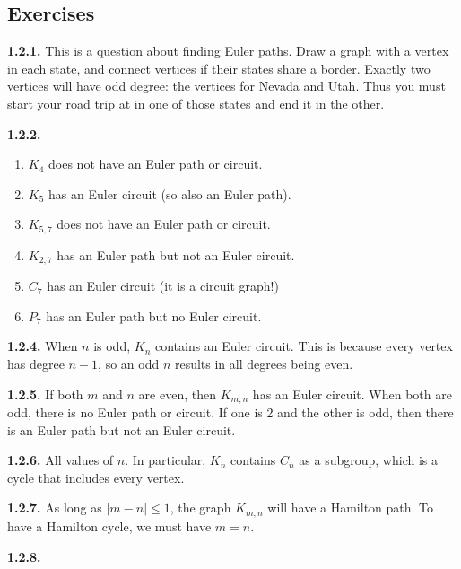 \documentclass[10pt,]{book}
\theoremstyle{plain}
\theoremstyle{definition}
\theoremstyle{definition}
\theoremstyle{definition}
\theoremstyle{definition}
\numberwithin{equation}{chapter}
\begin{document}
\subsection*{ Exercises}
\noindent\textbf{1.2.1.} \hypertarget{p-161}{}%
This is a question about finding Euler paths. Draw a graph with a vertex in each state, and connect vertices if their states share a border. Exactly two vertices will have odd degree: the vertices for Nevada and Utah. Thus you must start your road trip at in one of those states and end it in the other.%
\par\smallskip
\noindent\textbf{1.2.2.} \hypertarget{p-163}{}%
\leavevmode%
\begin{enumerate}[label=(\alph*)]
\item\hypertarget{li-54}{}\(K_4\) does not have an Euler path or circuit.%
\item\hypertarget{li-55}{}\(K_5\) has an Euler circuit (so also an Euler path).%
\item\hypertarget{li-56}{}\(K_{5,7}\) does not have an Euler path or circuit.%
\item\hypertarget{li-57}{}\(K_{2,7}\) has an Euler path but not an Euler circuit.%
\item\hypertarget{li-58}{}\(C_7\) has an Euler circuit (it is a circuit graph!)%
\item\hypertarget{li-59}{}\(P_7\) has an Euler path but no Euler circuit.%
\end{enumerate}
%
\par\smallskip
\noindent\textbf{1.2.4.} \hypertarget{p-170}{}%
When \(n\) is odd, \(K_n\) contains an Euler circuit. This is because every vertex has degree \(n-1\), so an odd \(n\) results in all degrees being even.%
\par\smallskip
\noindent\textbf{1.2.5.} \hypertarget{p-172}{}%
If both \(m\) and \(n\) are even, then \(K_{m,n}\) has an Euler circuit. When both are odd, there is no Euler path or circuit. If one is 2 and the other is odd, then there is an Euler path but not an Euler circuit.%
\par\smallskip
\noindent\textbf{1.2.6.} \hypertarget{p-174}{}%
All values of \(n\). In particular, \(K_n\) contains \(C_n\) as a subgroup, which is a cycle that includes every vertex.%
\par\smallskip
\noindent\textbf{1.2.7.} \hypertarget{p-176}{}%
As long as \(|m-n| \le 1\), the graph \(K_{m,n}\) will have a Hamilton path. To have a Hamilton cycle, we must have \(m=n\).%
\par\smallskip
\noindent\textbf{1.2.8.} \hypertarget{p-178}{}%
\end{document}
